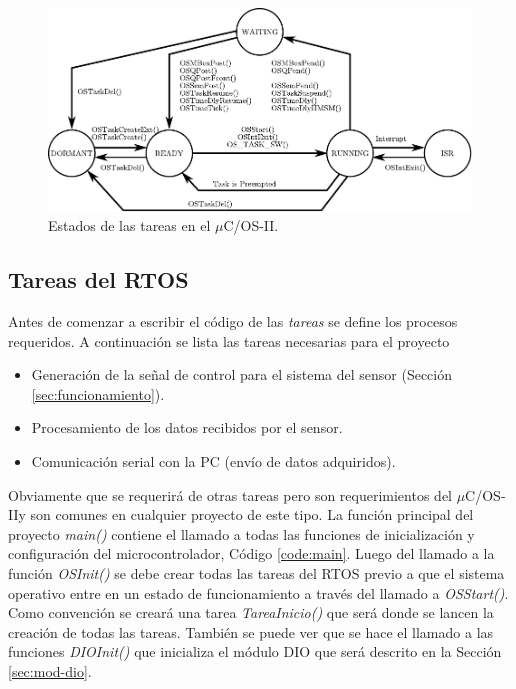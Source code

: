 \documentclass[11pt,a4paper,oneside]{article}
\def\uCOS{$\mu$C/OS-II\texttrademark}
\begin{document}
\begin{figure}[h]
  \centering
  \includegraphics[width=\textwidth]{images/ucos_flujo_tareas}
  \caption{Estados de las tareas en el \uCOS.}
  \label{fig:ucos-flujo}
\end{figure}

\subsection{Tareas del RTOS}
\label{sec:tareas-rtos}

Antes de comenzar a escribir el código de las \emph{tareas} se define los procesos requeridos. A continuación se lista las tareas necesarias para el proyecto
\begin{itemize}
\item Generación de la señal de control para el sistema del sensor (Sección \ref{sec:funcionamiento}).
\item Procesamiento de los datos recibidos por el sensor.
\item Comunicación serial con la PC (envío de datos adquiridos).
\end{itemize}
Obviamente que se requerirá de otras tareas pero son requerimientos del \uCOS y son comunes en cualquier proyecto de este tipo. La función principal del proyecto \emph{main()} contiene el llamado a todas las funciones de inicialización y configuración del microcontrolador, Código \ref{code:main}. Luego del llamado a la función \emph{OSInit()} se debe crear todas las tareas del RTOS previo a que el sistema operativo entre en un estado de funcionamiento a través del llamado a \emph{OSStart()}. Como convención se creará una tarea \emph{TareaInicio()} que será donde se lancen la creación de todas las tareas. También se puede ver que se hace el llamado a las funciones \emph{DIOInit()} que inicializa el módulo DIO que será descrito en la Sección \ref{sec:mod-dio}.
\end{document}
